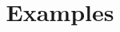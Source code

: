 \documentclass{ximera}
\title{Examples}
\begin{document}
    \begin{abstract}   \end{abstract}
    \maketitle
\end{document}
